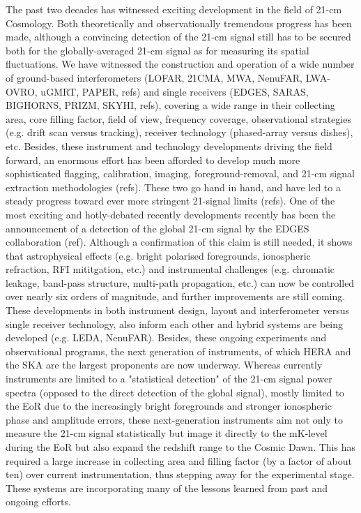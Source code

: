 The past two decades has witnessed exciting development in the field of 21-cm Cosmology. Both theoretically and observationally tremendous progress has been made, although a convincing detection of the 21-cm signal still has to be secured both for the globally-averaged 21-cm signal as for measuring its spatial fluctuations. We have witnessed the construction and operation of a wide number of ground-based interferometers (LOFAR, 21CMA, MWA, NenuFAR, LWA-OVRO, uGMRT, PAPER, refs) and single receivers (EDGES, SARAS, BIGHORNS, PRIZM, SKYHI, refs), covering a wide range in their collecting area, core filling factor, field of view, frequency coverage, observational strategies (e.g. drift scan versus tracking), receiver technology (phased-array versus dishes), etc. Besides, these instrument and technology developments driving the field forward, an enormous effort has been afforded to develop much more sophisticated flagging, calibration, imaging, foreground-removal, and 21-cm signal extraction methodologies (refs). These two go hand in hand, and have led to a steady progress toward ever more stringent 21-signal limits (refs). 
%
One of the most exciting and hotly-debated recently developments recently has been the announcement of a detection of the global 21-cm signal by the EDGES collaboration (ref). Although a confirmation of this claim is still needed, it shows that astrophysical effects (e.g. bright polarised foregrounds, ionospheric refraction, RFI mititgation, etc.) and instrumental challenges (e.g. chromatic leakage, band-pass structure, multi-path propagation, etc.) can now be controlled over nearly six orders of magnitude, and further improvements are still coming. 
%
These developments in both instrument design, layout and interferometer versus single receiver technology, also inform each other and hybrid systems are being developed (e.g. LEDA, NenuFAR).
%
Besides, these ongoing experiments and observational programs, the next generation of instruments, of which HERA and the SKA are the largest proponents are now underway. Whereas currently instruments are limited to a "statistical detection" of the 21-cm signal power spectra (opposed to the direct detection of the global signal), mostly limited to the EoR due to the increasingly bright foregrounds and stronger ionospheric phase and amplitude errors, these next-generation instruments aim not only to measure the 21-cm signal statistically but image it directly to the mK-level during the EoR but also expand the redshift range to the Cosmic Dawn. This has required a large increase in collecting area and filling factor (by a factor of about ten) over current instrumentation, thus stepping away for the experimental stage. These systems are incorporating many of the lessons learned from past and ongoing efforts.   

